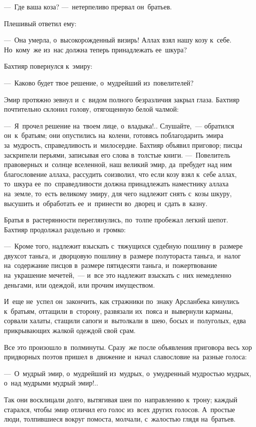 \documentclass[12pt,a4paper]{book}
\begin{document}
—~Где ваша коза? —~нетерпеливо прервал он~братьев.

Плешивый ответил ему:

—~Она умерла, о~высокорожденный визирь! Аллах взял нашу козу к~себе. Но~кому~же из~нас должна теперь принадлежать ее~шкура?

Бахтияр повернулся к~эмиру:

—~Каково будет твое решение, о~мудрейший из~повелителей?

Эмир протяжно зевнул и~с~видом полного безразличия закрыл глаза. Бахтияр почтительно склонил голову, отягощенную белой чалмой:

—~Я~прочел решение на~твоем лице, о~владыка!.. Слушайте,~— обратился он~к~братьям; они опустились на~колени, готовясь поблагодарить эмира за~мудрость, справедливость и~милосердие. Бахтияр объявил приговор; писцы заскрипели перьями, записывая его слова в~толстые книги. —~Повелитель правоверных и~солнце вселенной, наш великий эмир, да~пребудет над ним благословение аллаха, рассудить соизволил, что если козу взял к~себе аллах, то~шкура ее~по~справедливости должна принадлежать наместнику аллаха на~земле, то~есть великому эмиру, для чего надлежит снять с~козы шкуру, высушить и~обработать ее~и~принести во~дворец и~сдать в~казну.

Братья в~растерянности переглянулись, по~толпе пробежал легкий шепот. Бахтияр продолжал раздельно и~громко:

—~Кроме того, надлежит взыскать с~тяжущихся судебную пошлину в~размере двухсот таньга, и~дворцовую пошлину в~размере полутораста таньга, и~налог на~содержание писцов в~размере пятидесяти таньга, и~пожертвование на~украшение мечетей,~— и~все это надлежит взыскать с~них немедленно деньгами, или одеждой, или прочим имуществом.

И~еще не~успел он~закончить, как стражники по~знаку Арсланбека кинулись к~братьям, оттащили в~сторону, развязали их~пояса и~вывернули карманы, сорвали халаты, стащили сапоги и~вытолкали в~шею, босых и~полуголых, едва прикрывающих жалкой одеждой свой срам.

Все это произошло в~полминуты. Сразу~же после объявления приговора весь хор придворных поэтов пришел в~движение и~начал славословие на~разные голоса:

—~О~мудрый эмир, о~мудрейший из~мудрых, о~умудренный мудростью мудрых, о~над мудрыми мудрый эмир!..

Так они восклицали долго, вытягивая шеи по~направлению к~трону; каждый старался, чтобы эмир отличил его голос из~всех других голосов. А~простые люди, толпившиеся вокруг помоста, молчали, с~жалостью глядя на~братьев.
\end{document}
